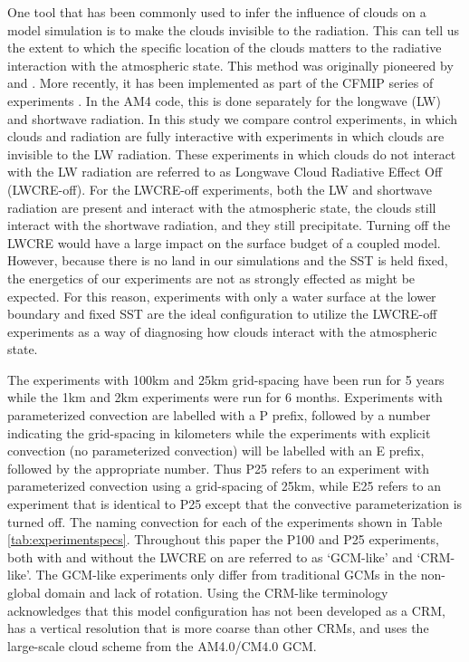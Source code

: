 \documentclass[draft]{agujournal2019}
\begin{document}
One tool that has been commonly used to infer the influence of clouds on a model simulation is to make the clouds invisible to the radiation.  
This can tell us the extent to which the specific location of the clouds matters to the radiative interaction with the 
atmospheric state.   This method was originally pioneered by  and .  
More recently, it has been
implemented as part of the CFMIP series of experiments \cite{Stevens_etal_2012, Webb_etal_2017}.
In the AM4 code, this is done separately for the longwave (LW) and shortwave radiation.  
In this study we compare control experiments, in which clouds and radiation are fully interactive with experiments in which clouds are invisible to the LW radiation.  
These experiments in which clouds do not interact with the LW radiation are referred to as Longwave Cloud Radiative Effect Off (LWCRE-off).  
For the LWCRE-off experiments, both the LW and shortwave radiation are present and interact with 
the atmospheric state, the clouds still interact with the shortwave radiation, and they still precipitate.   
Turning off the LWCRE would have a large impact on the surface budget of a coupled model.  
However, because there is no land in our simulations and the SST is held fixed, the energetics of our experiments are not as
strongly effected as might be expected.  For this reason, experiments with only a water surface at the lower boundary and 
fixed SST are the ideal configuration to utilize the LWCRE-off experiments as a way of diagnosing how clouds interact with 
the atmospheric state.  


The experiments with 100km and 25km grid-spacing have been run for 5 years while the 
1km and 2km experiments were run for 6 months.  Experiments with parameterized convection are labelled with a P prefix, followed
by a number indicating the grid-spacing in kilometers while the experiments with explicit convection (no parameterized convection) will be 
labelled with an E prefix, followed by the appropriate number.  Thus P25 refers to an experiment with parameterized convection using a 
grid-spacing of 25km, while E25 refers to an experiment that is identical to P25 except that the convective parameterization is turned off. 
The naming convection for each of the experiments shown in Table \ref{tab:experimentspecs}.   
Throughout this paper the P100 and P25 experiments, both with and without the LWCRE on are referred to as `GCM-like' and
`CRM-like'.  The GCM-like experiments only differ from traditional GCMs in the non-global domain and lack of rotation.  
Using the CRM-like terminology acknowledges that this model configuration has not been developed as a CRM, has a vertical resolution that is more coarse than other CRMs, and uses the large-scale cloud scheme from the AM4.0/CM4.0 GCM.  
  
\end{document}
